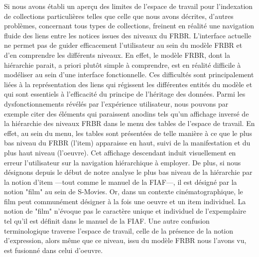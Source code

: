 Si nous avons établi un aperçu des limites de l'espace de travail pour l'indexation de collections particulières telles que celle que nous avons décrites, d'autres problèmes, concernant tous types de collections, freinent en réalité une navigation fluide des liens entre les notices issues des niveaux du FRBR. L'interface actuelle ne permet pas de guider efficacement l'utilisateur au sein du modèle FRBR et d'en comprendre les différents niveaux. En effet, le modèle FRBR, dont la hiérarchie parait, a priori plutôt simple à comprendre, est en réalité difficile à modéliser au sein d'une interface fonctionnelle. Ces difficultés sont principalement liées à la représentation des liens qui régissent les différentes entités du modèle et qui sont essentiels à l'efficacité du principe de l'héritage des données. Parmi les dysfonctionnements révélés par l'expérience utilisateur, nous pouvons par exemple citer des éléments qui paraissent anodins tels qu'un affichage inversé de la hiérarchie des niveaux FRBR dans le menu des tables de l'espace de travail. En effet, au sein du menu, les tables sont présentées de telle manière à ce que le plus bas niveau du FRBR (l'item) apparaisse en haut, suivi de la manifestation et du plus haut niveau (l'oeuvre). Cet affichage descendant induit visuellement en erreur l'utilisateur sur la navigation hiérarchique à employer. De plus, si  nous désignons depuis le début de notre analyse le plus bas niveau de la hiérarchie par la notion d'item ---tout comme le manuel de la FIAF---, il est désigné par la notion "film" au sein de S-Movies. Or, dans un contexte cinématographique, le film peut communément désigner  à la fois une oeuvre et un item individuel. La notion de "film" n'évoque pas le caractère unique et individuel de l'expemplaire tel qu'il est définit dans le manuel de la FIAF. Une autre confusion terminologique traverse l'espace de travail, celle de la présence de la notion d'expression, alors même que ce niveau, issu du modèle FRBR nous l'avons vu, est fusionné dans celui d'oeuvre. 
